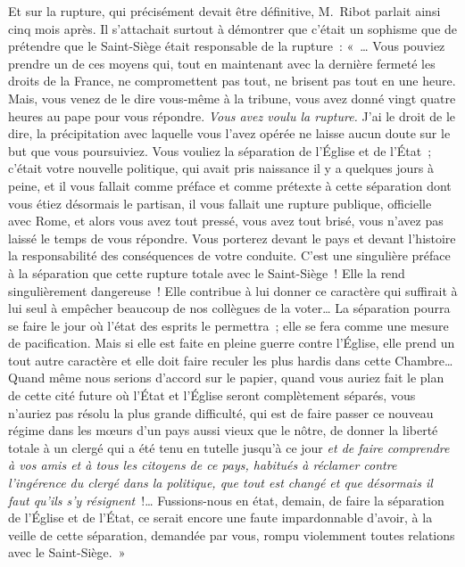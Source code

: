 \documentclass[french,twoside]{book} %
\begin{document}
Et sur la rupture, qui précisément devait être définitive, M. Ribot parlait ainsi cinq mois après. Il s’attachait surtout à démontrer que c’était un sophisme que de prétendre que le Saint-Siège était responsable de la rupture : « … Vous pouviez prendre un de ces moyens qui, tout en maintenant avec la dernière fermeté les droits de la France, ne compromettent pas tout, ne brisent pas tout en une heure. Mais, vous venez de le dire vous-même  à la tribune, vous avez donné vingt quatre heures au pape pour vous répondre. {\itshape Vous avez voulu la rupture.} J’ai le droit de le dire, la précipitation avec laquelle vous l’avez opérée ne laisse aucun doute sur le but que vous poursuiviez. Vous vouliez la séparation de l’Église et de l’État ; c’était votre nouvelle politique, qui avait pris naissance il y a quelques jours à peine, et il vous fallait comme préface et comme prétexte à cette séparation dont vous étiez désormais le partisan, il vous fallait une rupture publique, officielle avec Rome, et alors vous avez tout pressé, vous avez tout brisé, vous n’avez pas laissé le temps de vous répondre. Vous porterez devant le pays et devant l’histoire la responsabilité des conséquences de votre conduite. C’est une singulière préface à la séparation que cette rupture totale avec le Saint-Siège ! Elle la rend singulièrement dangereuse ! Elle contribue à lui donner ce caractère qui suffirait à lui seul à empêcher beaucoup de nos collègues de la voter… La séparation pourra se faire le jour où l’état des esprits le permettra ; elle se fera comme une mesure de pacification. Mais si elle est faite en pleine guerre contre l’Église, elle prend un tout autre caractère et elle doit faire reculer les plus hardis dans cette Chambre… Quand même nous serions d’accord sur  le papier, quand vous auriez fait le plan de cette cité future où l’État et l’Église seront complètement séparés, vous n’auriez pas résolu la plus grande difficulté, qui est de faire passer ce nouveau régime dans les mœurs d’un pays aussi vieux que le nôtre, de donner la liberté totale à un clergé qui a été tenu en tutelle jusqu’à ce jour {\itshape et de faire comprendre à vos amis et à tous les citoyens de ce pays, habitués à réclamer contre l’ingérence du clergé dans la politique, que tout est changé et que désormais il faut qu’ils s’y résignent} !… Fussions-nous en état, demain, de faire la séparation de l’Église et de l’État, ce serait encore une faute impardonnable d’avoir, à la veille de cette séparation, demandée par vous, rompu violemment toutes relations avec le Saint-Siège. »\par
\end{document}
